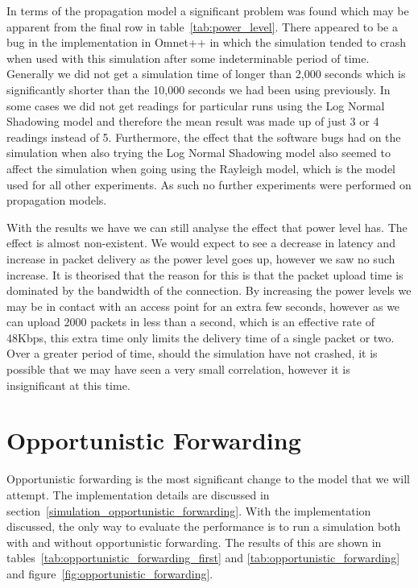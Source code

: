         In terms of the propagation model a significant problem was found which may be apparent from the final row in table~\ref{tab:power_level}. There appeared to be a bug in the implementation in Omnet++ in which the simulation tended to crash when used with this simulation after some indeterminable period of time. Generally we did not get a simulation time of longer than 2,000 seconds which is significantly shorter than the 10,000 seconds we had been using previously. In some cases we did not get readings for particular runs using the Log Normal Shadowing model and therefore the mean result was made up of just 3 or 4 readings instead of 5. Furthermore, the effect that the software bugs had on the simulation when also trying the Log Normal Shadowing model also seemed to affect the simulation when going using the Rayleigh model, which is the model used for all other experiments. As such no further experiments were performed on propagation models. 

        With the results we have we can still analyse the effect that power level has. The effect is almost non-existent. We would expect to see a decrease in latency and increase in packet delivery as the power level goes up, however we saw no such increase. It is theorised that the reason for this is that the packet upload time is dominated by the bandwidth of the connection. By increasing the power levels we may be in contact with an access point for an extra few seconds, however as we can upload 2000 packets in less than a second, which is an effective rate of 48Kbps, this extra time only limits the delivery time of a single packet or two. Over a greater period of time, should the simulation have not crashed, it is possible that we may have seen a very small correlation, however it is insignificant at this time. 


    \section{Opportunistic Forwarding}\label{data_gathering_performance_opportunistic_forwarding}

        Opportunistic forwarding is the most significant change to the model that we will attempt. The implementation details are discussed in section~\ref{simulation_opportunistic_forwarding}. With the implementation discussed, the only way to evaluate the performance is to run a simulation both with and without opportunistic forwarding. The results of this are shown in tables~\ref{tab:opportunistic_forwarding_first} and \ref{tab:opportunistic_forwarding} and figure~\ref{fig:opportunistic_forwarding}.

